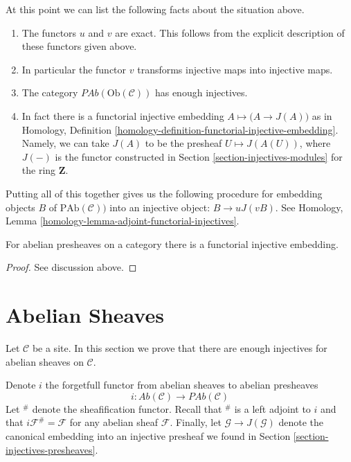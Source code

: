 \medskip\noindent
At this point we can list the following facts
about the situation above.
\begin{enumerate}
\item The functors $u$ and $v$ are exact. This follows from
the explicit description of these functors given above.
\item In particular the functor $v$ transforms injective maps
into injective maps.
\item The category $\textit{PAb}(\text{Ob}(\mathcal{C}))$
has enough injectives.
\item In fact there is a functorial injective embedding
$A \mapsto \big(A \to J(A)\big)$ as in
Homology, Definition \ref{homology-definition-functorial-injective-embedding}.
Namely, we can take $J(A)$ to be the
presheaf $U\mapsto J(A(U))$, where
$J(-)$ is the functor constructed in
Section \ref{section-injectives-modules} for the ring $\mathbf{Z}$.
\end{enumerate}
Putting all of this together gives us the following procedure
for embedding objects $B$ of $\text{PAb}(\mathcal{C}))$ into
an injective object: $B \to uJ(vB)$. See 
Homology, Lemma \ref{homology-lemma-adjoint-functorial-injectives}.

\begin{proposition}
\label{proposition-presheaves-injectives}
For abelian presheaves on a category there is a functorial injective
embedding.
\end{proposition}

\begin{proof}
See discussion above.
\end{proof}

\section{Abelian Sheaves}
\label{section-injectives-sheaves}

\noindent
Let $\mathcal{C}$ be a site. In this section we prove that there are 
enough injectives for abelian sheaves on $\mathcal{C}$. 

\medskip\noindent
Denote $i$ the forgetfull functor from abelian sheaves to
abelian presheaves
$$
i : \textit{Ab}(\mathcal{C}) \longrightarrow \textit{PAb}(\mathcal{C})
$$
Let ${}^\#$ denote the sheafification functor. Recall that
${}^\#$ is a left adjoint to $i$
and that  $i\mathcal{F}^\# = \mathcal{F}$ for any abelian
sheaf $\mathcal{F}$.
Finally, let $\mathcal{G} \to J(\mathcal{G})$ denote the canonical
embedding into an injective presheaf we found in 
Section \ref{section-injectives-presheaves}. 


